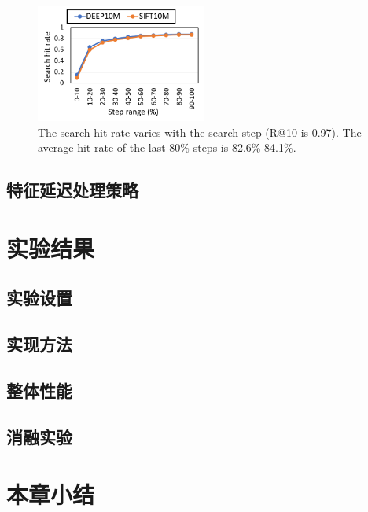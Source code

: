 \begin{figure}
  \centering
  \includegraphics[width=0.5\textwidth]{figures/context-2/hitrate.pdf}
  \caption{The search hit rate varies with the search step (R@10 is 0.97). The average hit rate of the last 80\% steps is 82.6\%-84.1\%.}
  \label{fig:hitrate}
\end{figure}

\subsection{特征延迟处理策略}\label{sec:dist-method-feature}



\section{实验结果}\label{sec:dist-experiment}
\subsection{实验设置}

\subsection{实现方法}

\subsection{整体性能}

\subsection{消融实验}



\section{本章小结}\label{sec:dist-conclusion}